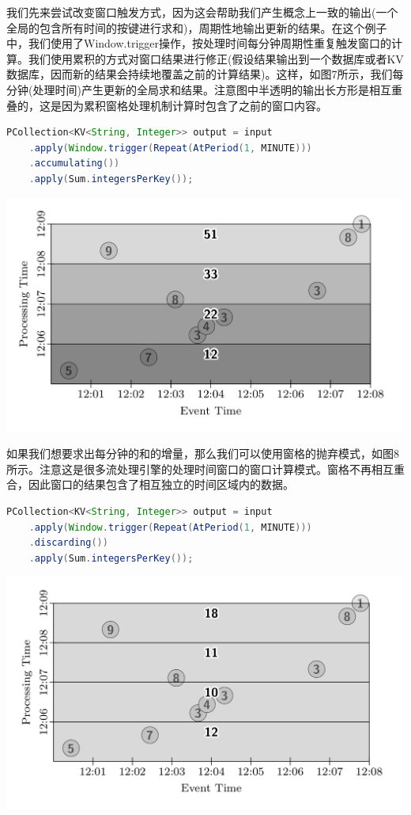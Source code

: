 \documentclass[oneside]{ctexbook}
\begin{document}
我们先来尝试改变窗口触发方式，因为这会帮助我们产生概念上一致的输出(一个全局的包含所有时间的按键进行求和)，周期性地输出更新的结果。在这个例子中，我们使用了Window.trigger操作，按处理时间每分钟周期性重复触发窗口的计算。我们使用累积的方式对窗口结果进行修正(假设结果输出到一个数据库或者KV数据库，因而新的结果会持续地覆盖之前的计算结果)。这样，如图7所示，我们每分钟(处理时间)产生更新的全局求和结果。注意图中半透明的输出长方形是相互重叠的，这是因为累积窗格处理机制计算时包含了之前的窗口内容。

\begin{lstlisting}[language=java]
PCollection<KV<String, Integer>> output = input
    .apply(Window.trigger(Repeat(AtPeriod(1, MINUTE)))
    .accumulating())
    .apply(Sum.integersPerKey());
\end{lstlisting}

\noindent \includegraphics[width=\textwidth]{globalwindows.png}

如果我们想要求出每分钟的和的增量，那么我们可以使用窗格的抛弃模式，如图8所示。注意这是很多流处理引擎的处理时间窗口的窗口计算模式。窗格不再相互重合，因此窗口的结果包含了相互独立的时间区域内的数据。

\begin{lstlisting}[language=java]
PCollection<KV<String, Integer>> output = input
    .apply(Window.trigger(Repeat(AtPeriod(1, MINUTE)))
    .discarding())
    .apply(Sum.integersPerKey());
\end{lstlisting}

\noindent \includegraphics[width=\textwidth]{discarding.png}
\end{document}
